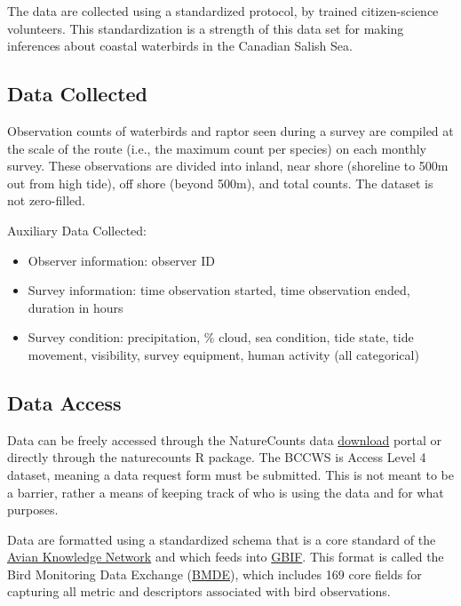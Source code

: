 \documentclass[
  letterpaper,
  DIV=11,
  numbers=noendperiod]{scrreprt}
\begin{document}
The data are collected using a standardized protocol, by trained
citizen-science volunteers. This standardization is a strength of this
data set for making inferences about coastal waterbirds in the Canadian
Salish Sea.

\subsection{Data Collected}\label{data-collected}

Observation counts of waterbirds and raptor seen during a survey are
compiled at the scale of the route (i.e., the maximum count per species)
on each monthly survey. These observations are divided into inland, near
shore (shoreline to 500m out from high tide), off shore (beyond 500m),
and total counts. The dataset is not zero-filled.

Auxiliary Data Collected:

\begin{itemize}
\item
  Observer information: observer ID
\item
  Survey information: time observation started, time observation ended,
  duration in hours
\item
  Survey condition: precipitation, \% cloud, sea condition, tide state,
  tide movement, visibility, survey equipment, human activity (all
  categorical)
\end{itemize}

\subsection{Data Access}\label{data-access}

Data can be freely accessed through the NatureCounts data
\href{https://naturecounts.ca/nc/default/searchquery.jsp}{download}
portal or directly through the naturecounts R package. The BCCWS is
Access Level 4 dataset, meaning a data request form must be submitted.
This is not meant to be a barrier, rather a means of keeping track of
who is using the data and for what purposes.

Data are formatted using a standardized schema that is a core standard
of the \href{https://avianknowledge.net/}{Avian Knowledge Network} and
which feeds into \href{https://www.gbif.org/}{GBIF}. This format is
called the Bird Monitoring Data Exchange
(\href{https://naturecounts.ca/nc/default/nc_bmde.jsp}{BMDE}), which
includes 169 core fields for capturing all metric and descriptors
associated with bird observations.
\end{document}
